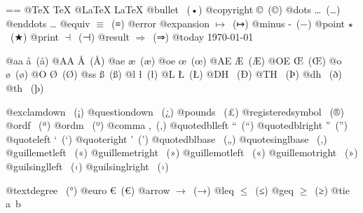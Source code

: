 \documentclass{book}
\makeatletter
\newenvironment{Texinfopreformatted}{%
  \par\GNUTobeylines\obeyspaces\frenchspacing\parskip=\z@\parindent=\z@}{}
{\catcode`\^^M=13 \gdef\GNUTobeylines{\catcode`\^^M=13 \def^^M{\null\par}}}
\newenvironment{Texinfoindented}{\begin{list}{}{}\item\relax}{\end{list}}
\renewcommand{\_}{\Texinfounderscore\discretionary{}{}{}}
\makeatother
\begin{document}
\begin{Texinfoindented}
\begin{Texinfopreformatted}
@TeX \TeX{}
@LaTeX \LaTeX{}
@bullet \textbullet{}\ (•)
@copyright \copyright{}\ (©)
@dots \dots{}\@\ (…)
@enddots \dots{}
@equiv $\equiv{}$\ (≡)
@error 
@expansion $\mapsto{}$\ (↦)
@minus -\ (−)
@point $\star{}$\ (★)
@print $\dashv{}$\ (⊣)
@result $\Rightarrow{}$\ (⇒)
@today \today{}

@aa \aa{}\ (å)
@AA \AA{}\ (Å)
@ae \ae{}\ (æ)
@oe \oe{}\ (œ)
@AE \AE{}\ (Æ)
@OE \OE{}\ (Œ)
@o \o{}\ (ø)
@O \O{}\ (Ø)
@ss \ss{}\ (ß)
@l \l{}\ (ł)
@L \L{}\ (Ł)
@DH \DH{}\ (Ð)
@TH \TH{}\ (Þ)
@dh \dh{}\ (ð)
@th \th{}\ (þ)

@exclamdown \textexclamdown{}\ (¡)
@questiondown \textquestiondown{}\ (¿)
@pounds \textsterling{}\ (£)
@registeredsymbol \circledR{}\ (®)
@ordf \textordfeminine{}\ (ª)
@ordm \textordmasculine{}\ (º)
@comma ,\ (,)
@quotedblleft \textquotedblleft{}\ (“)
@quotedblright \textquotedblright{}\ (”)
@quoteleft \textquoteleft{}\ (‘)
@quoteright \textquoteright{}\ (’)
@quotedblbase \quotedblbase{}\ („)
@quotesinglbase \quotesinglbase{}\ (‚)
@guillemetleft \guillemotleft{}\ («)
@guillemetright \guillemotright{}\ (»)
@guillemotleft \guillemotleft{}\ («)
@guillemotright \guillemotright{}\ (»)
@guilsinglleft \guilsinglleft{}\ (‹)
@guilsinglright \guilsinglright{}\ (›)

@textdegree \textdegree{}\ (°)
@euro \euro{}\ (€)
@arrow $\rightarrow{}$\ (→)
@leq $\leq{}$\ (≤)
@geq $\geq{}$\ (≥)
@tie a~b


\end{Texinfopreformatted}
\end{Texinfoindented}
\end{document}
